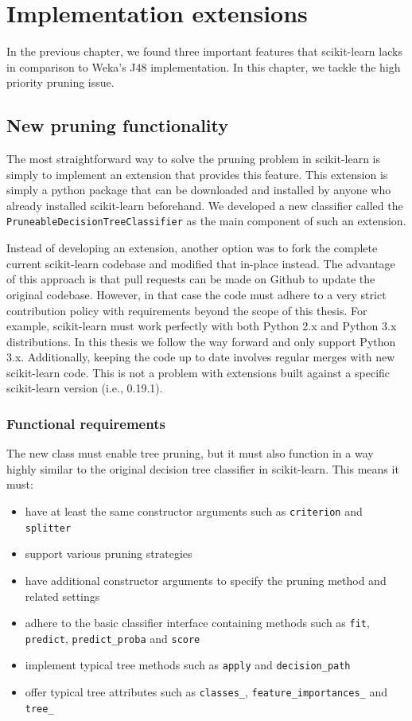 \chapter{Implementation extensions}\label{cha:software_new}
In the previous chapter, we found three important features that scikit-learn lacks in comparison to Weka's J48 implementation. In this chapter, we tackle the high priority pruning issue.

\section{New pruning functionality}
The most straightforward way to solve the pruning problem in scikit-learn is simply to implement an extension that provides this feature. This extension is simply a python package that can be downloaded and installed by anyone who already installed scikit-learn beforehand. We developed a new classifier called the \texttt{PruneableDecisionTreeClassifier} as the main component of such an extension. 

Instead of developing an extension, another option was to fork the complete current scikit-learn codebase and modified that in-place instead. The advantage of this approach is that pull requests can be made on Github to update the original codebase. However, in that case the code must adhere to a very strict contribution policy with requirements beyond the scope of this thesis. For example, scikit-learn must work perfectly with both Python 2.x and Python 3.x distributions. In this thesis we follow the way forward and only support Python 3.x. Additionally, keeping the code up to date involves regular merges with new scikit-learn code. This is not a problem with extensions built against a specific scikit-learn version (i.e., 0.19.1).

\subsection{Functional requirements}
The new class must enable tree pruning, but it must also function in a way highly similar to the original decision tree classifier in scikit-learn. This means it must:
\begin{itemize}
    \item have at least the same constructor arguments such as \texttt{criterion} and \texttt{splitter}
    \item support various pruning strategies
    \item have additional constructor arguments to specify the pruning method and related settings
    \item adhere to the basic classifier interface containing methods such as \texttt{fit}, \texttt{predict}, \texttt{predict\_proba} and \texttt{score}
    \item implement typical tree methods such as \texttt{apply} and \texttt{decision\_path}
    \item offer typical tree attributes such as \texttt{classes\_}, \texttt{feature\_importances\_} and \texttt{tree\_}
\end{itemize}

